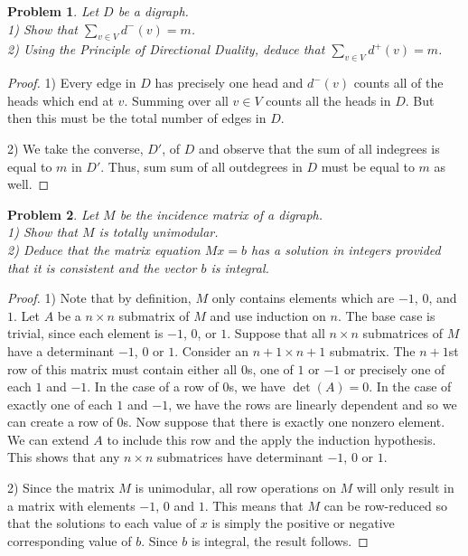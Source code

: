 \documentclass{article}
\newtheorem{problem}{Problem}
\begin{document}
\begin{flushleft}
\begin{problem}
Let $D$ be a digraph.\\
1) Show that $\sum_{v \in V} d^- (v) = m$.\\
2) Using the Principle of Directional Duality, deduce that $\sum_{v \in V} d^+ (v) = m$.
\end{problem}
\begin{proof}
1) Every edge in $D$ has precisely one head and $d^-(v)$ counts all of the heads which end at $v$. Summing over all $v \in V$ counts all the heads in $D$. But then this must be the total number of edges in $D$.\newline

2) We take the converse, $D'$, of $D$ and observe that the sum of all indegrees is equal to $m$ in $D'$. Thus, sum sum of all outdegrees in $D$ must be equal to $m$ as well.
\end{proof}

\begin{problem}
Let $M$ be the incidence matrix of a digraph.\\
1) Show that $M$ is totally unimodular.\\
2) Deduce that the matrix equation $Mx = b$ has a solution in integers provided that it is consistent and the vector $b$ is integral.
\end{problem}
\begin{proof}
1) Note that by definition, $M$ only contains elements which are $-1$, $0$, and $1$. Let $A$ be a $n \times n$ submatrix of $M$ and use induction on $n$. The base case is trivial, since each element is $-1$, $0$, or $1$. Suppose that all $n \times n$ submatrices of $M$ have a determinant $-1$, $0$ or $1$. Consider an $n+1 \times n+1$ submatrix. The $n+1$st row of this matrix must contain either all $0$s, one of $1$ or $-1$ or precisely one of each $1$ and $-1$. In the case of a row of $0$s, we have $\det (A) = 0$. In the case of exactly one of each $1$ and $-1$, we have the rows are linearly dependent and so we can create a row of $0$s. Now suppose that there is exactly one nonzero element. We can extend $A$ to include this row and the apply the induction hypothesis. This shows that any $n \times n$ submatrices have determinant $-1$, $0$ or $1$.\newline

2) Since the matrix $M$ is unimodular, all row operations on $M$ will only result in a matrix with elements $-1$, $0$ and $1$. This means that $M$ can be row-reduced so that the solutions to each value of $x$ is simply the positive or negative corresponding value of $b$. Since $b$ is integral, the result follows.
\end{proof}

\end{flushleft}
\end{document}
